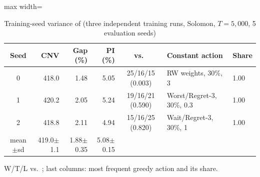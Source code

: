 \begin{table}[t]
\centering
\caption{Training-seed variance of \sgalns{} (three independent training runs, Solomon, $T=5{,}000$, 5 evaluation seeds)}\label{tab:seeds}
\setlength{\tabcolsep}{3pt}
\begin{adjustbox}{max width=\linewidth}
\begin{tabular}{crrrcll}
\toprule
Seed & CNV & Gap (\%) & PI (\%) & vs.\ \Rw{} & Constant action & Share\\ \midrule
0 & 418.0 & 1.48 & 5.05 & 25/16/15 (0.003) & RW weights, 30\%, 3 & 1.00\\
1 & 420.2 & 2.05 & 5.24 & 19/16/21 (0.590) & Worst/Regret-3, 30\%, 0.3 & 1.00\\
2 & 418.8 & 2.11 & 4.94 & 15/16/25 (0.820) & Wait/Regret-3, 30\%, 1 & 1.00\\
\midrule mean$\pm$sd & 419.0$\pm$1.1 & 1.88$\pm$0.35 & 5.08$\pm$0.15 & & & \\
\bottomrule
\end{tabular}
\end{adjustbox}
\par\vspace{2pt}\parbox{\linewidth}{\footnotesize W/T/L vs.\ \Rw{}; last columns: most frequent greedy action and its share.}
\end{table}

